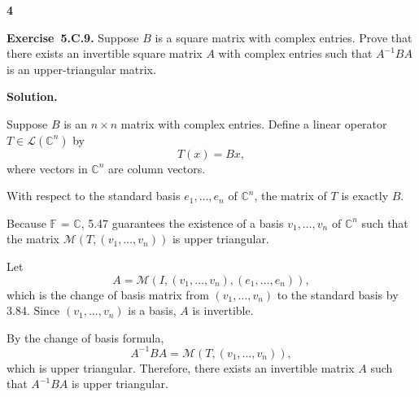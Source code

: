 \documentclass[11pt]{article}
\newcommand{\ProblemDivider}[1]{%
  \vspace{1.0em}
  \noindent\textbf{#1}\par
  \vspace{0.35em}
}
\newcommand{\ProblemAnnounce}{\noindent}
\newcommand{\SolutionAnnounce}{\noindent\textbf{Solution.}\par\medskip}
\newcommand{\Exercise}[1]{\textbf{Exercise~#1.}\;}
\newcommand{\C}{\mathbb{C}}
\newcommand{\F}{\mathbb{F}}
\newcommand{\calL}{\mathcal{L}}
\begin{document}
\ProblemDivider{4}

\begin{problemBox}
\ProblemAnnounce
\Exercise{5.C.9}
Suppose $B$ is a square matrix with complex entries. Prove that there exists an invertible square matrix $A$ with complex entries such that $A^{-1}BA$ is an upper-triangular matrix.
\end{problemBox}

\begin{solutionBox}
\SolutionAnnounce
\doublespacing

Suppose $B$ is an $n \times n$ matrix with complex entries. Define a linear operator 
$T \in \calL(\C^n)$ by
\[
T(x) = Bx,
\]
where vectors in $\C^n$ are column vectors.

With respect to the standard basis $e_1, \dots, e_n$ of $\C^n$, the matrix 
of $T$ is exactly $B$.

Because $\F$ = $\C$, 5.47 guarantees the existence 
of a basis $v_1, \dots, v_n$ of $\C^n$ such that the matrix 
$\mathcal{M}(T, (v_1,\dots,v_n))$ is upper triangular.

Let
\[
A = \mathcal{M}(I, (v_1,\dots,v_n), (e_1,\dots,e_n)),
\]
which is the change of basis matrix from $(v_1,\dots,v_n)$ to the standard basis by 3.84. Since 
$(v_1,\dots,v_n)$ is a basis, $A$ is invertible.

By the change of basis formula,
\[
A^{-1}BA
=
\mathcal{M}(T, (v_1,\dots,v_n)),
\]
which is upper triangular. Therefore, there exists an invertible matrix $A$ such 
that $A^{-1}BA$ is upper triangular.

\end{solutionBox}
\end{document}
